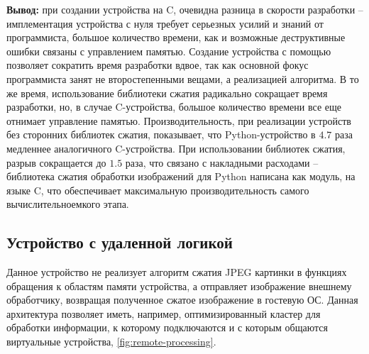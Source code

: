 \textbf{Вывод:} при создании устройства на C, очевидна разница
в скорости разработки -- имплементация устройства с нуля
требует серьезных усилий и знаний от программиста, большое количество
времени, как и возможные деструктивные ошибки связаны с управлением
памятью. Создание устройства с помощью {\mylanguage} позволяет
сократить время разработки вдвое, так как основной фокус программиста
занят не второстепенными вещами, а реализацией алгоритма.
В то же время, использование библиотеки сжатия радикально сокращает
время разработки, но, в случае C-устройства, большое количество
времени все еще отнимает управление памятью.
Производительность, при реализации устройств без сторонних
библиотек сжатия, показывает, что Python-устройство в $4.7$ раза
медленнее аналогичного C-устройства. При использовании
библиотек сжатия, разрыв сокращается до $1.5$ раза, что связано
с накладными расходами -- библиотека сжатия обработки изображений
для Python написана как модуль, на языке C, что обеспечивает
максимальную производительность самого вычислительноемкого этапа.

\subsection{Устройство с удаленной логикой}\label{sec:ch3/sec2/sec2}

Данное устройство не реализует алгоритм сжатия JPEG картинки в функциях обращения
к областям памяти устройства, а отправляет изображение внешнему обработчику,
возвращая полученное сжатое изображение в гостевую ОС.
Данная архитектура позволяет иметь, например, оптимизированный
кластер для обработки информации, к которому подключаются и с
которым общаются виртуальные устройства, \cref{fig:remote-processing}.

